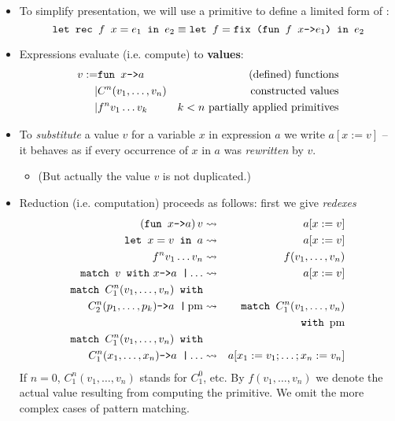 \documentclass{beamer}
\newcommand{\assign}{:=}
\newcommand{\tmem}[1]{{\em #1\/}}
\newcommand{\tmop}[1]{\ensuremath{\operatorname{#1}}}
\newcommand{\tmstrong}[1]{\textbf{#1}}
\newcommand{\tmverbatim}[1]{\text{{\ttfamily{#1}}}}
\begin{document}
\begin{itemize}
  \item To simplify presentation, we will use a primitive \tmverbatim{fix} to
  define a limited form of \tmverbatim{let rec}:
  \[ \text{\tmverbatim{let rec }} f \text{\tmverbatim{ }} x = e_1
     \text{\tmverbatim{ in }} e_2 \equiv \text{\tmverbatim{let }} f =
     \text{\tmverbatim{fix (fun }} f \text{\tmverbatim{ }} x
     \text{\tmverbatim{->}} e_1 \text{\tmverbatim{) in }} e_2 \]
  \item Expressions evaluate (i.e. compute) to {\tmstrong{values}}:
  \begin{eqnarray*}
    v \assign & \text{\tmverbatim{fun }} x \text{\tmverbatim{->}} a &
    \text{(defined) functions}\\
    | & C^n (v_1, \ldots, v_n) & \text{constructed values}\\
    | & f^n v_1 \ldots v_k & k < n \text{ partially applied primitives}
  \end{eqnarray*}
  \item To {\tmem{substitute}} a value $v$ for a variable $x$ in expression
  $a$ we write $a [x \assign v]$ -- it behaves as if every occurrence of $x$
  in $a$ was {\tmem{rewritten}} by $v$.
  \begin{itemize}
    \item (But actually the value $v$ is not duplicated.)
  \end{itemize}
  \item Reduction (i.e. computation) proceeds as follows: first we give
  {\tmem{redexes}}
  \begin{eqnarray*}
    \left( \text{\tmverbatim{fun }} x \text{\tmverbatim{->}} a \right) v &
    \rightsquigarrow & a [x \assign v]\\
    \text{\tmverbatim{let }} x = v \text{\tmverbatim{ in }} a &
    \rightsquigarrow & a [x \assign v]\\
    f^n v_1 \ldots v_n & \rightsquigarrow & f (v_1, \ldots, v_n)\\
    \text{\tmverbatim{match }} v \text{\tmverbatim{ with} } x
    \text{\tmverbatim{->}} a \text{\tmverbatim{ \textbar }} \ldots &
    \rightsquigarrow & a [x \assign v]\\
    \text{\tmverbatim{match }} C_1^n (v_1, \ldots, v_n) \text{\tmverbatim{
    with}} &  & \\
    C_2^n (p_1, \ldots, p_k) \text{\tmverbatim{->}} a \text{\tmverbatim{
    \textbar }} \tmop{pm} & \rightsquigarrow & \text{\tmverbatim{match }}
    C_1^n (v_1, \ldots, v_n)\\
    &  & \text{\tmverbatim{with} } \tmop{pm}\\
    \text{\tmverbatim{match }} C_1^n (v_1, \ldots, v_n) \text{\tmverbatim{
    with}} &  & \\
    C_1^n (x_1, \ldots, x_n) \text{\tmverbatim{->}} a \text{\tmverbatim{
    \textbar }} \ldots & \rightsquigarrow & a [x_1 \assign v_1 ; \ldots ; x_n
    \assign v_n]
  \end{eqnarray*}
  If $n = 0$, $C_1^n (v_1, \ldots, v_n)$ stands for $C^0_1$, etc. By $f (v_1,
  \ldots, v_n)$ we denote the actual value resulting from computing the
  primitive. We omit the more complex cases of pattern matching.
  

\end{itemize}
\end{document}
